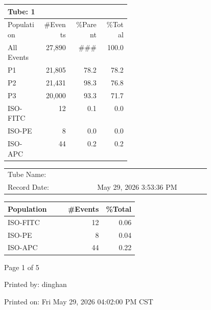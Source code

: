\documentclass[UTF8,10pt,a4paper,fontset=fandol]{ctexart}
\newcommand{\fieldvalue}[1]{#1}
\begin{document}
\begin{center}
\begin{tabular}{|p{0.28\linewidth}|r|r|r|}
\hline
\multicolumn{4}{|l|}{Tube: 
\fieldvalue{1}}\\
\hline
Population & \#Events & \%Parent & \%Total\\
\hline
All Events & 27,890 & \#\#\# & 100.0\\
\hspace{1em}P1 & 21,805 & 78.2 & 78.2\\
\hspace{1em}P2 & 21,431 & 98.3 & 76.8\\
\hspace{1em}P3 & 20,000 & 93.3 & 71.7\\
\hspace{1em}ISO-FITC & 12 & 0.1 & 0.0\\
\hspace{1em}ISO-PE & 8 & 0.0 & 0.0\\
\hspace{1em}ISO-APC & 44 & 0.2 & 0.2\\
\hline
\end{tabular}
\end{center}

\begin{center}
\begin{tabular}{|p{0.34\linewidth}|p{0.43\linewidth}|}
\hline
Tube Name: & \\[0.35em]
Record Date: &
\fieldvalue{May 29, 2026 3:53:36 PM}\\
\hline
\end{tabular}
\end{center}

\begin{center}
\begin{tabular}{|p{0.46\linewidth}|r|r|}
\hline
Population & \#Events & \%Total\\
\hline
ISO-FITC & 12 & 0.06\\
ISO-PE & 8 & 0.04\\
ISO-APC & 44 & 0.22\\
\hline
\end{tabular}
\end{center}

\hfill Page 1 of 5

\hfill Printed by: dinghan

\hfill Printed on: Fri May 29, 2026 04:02:00 PM CST
\end{document}
